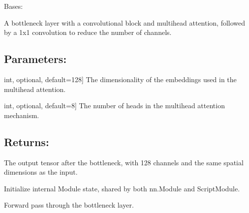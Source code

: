 \documentclass[a4paper,10pt,english]{sphinxmanual}
\begin{document}
\begin{fulllineitems}
\label{\detokenize{models:fireDiff.Models.unet.Bottleneck}}
\pysigstartsignatures
{}
\pysigstopsignatures
\sphinxAtStartPar
Bases: 

\sphinxAtStartPar
A bottleneck layer with a convolutional block and multi\sphinxhyphen{}head attention,
followed by a 1x1 convolution to reduce the number of channels.


\subsection{Parameters:}
\label{\detokenize{models:parameters}}\begin{description}
\sphinxlineitem{embed\_dim}{[}int, optional, default=128{]}
\sphinxAtStartPar
The dimensionality of the embeddings used in the multi\sphinxhyphen{}head attention.

\sphinxlineitem{num\_heads}{[}int, optional, default=8{]}
\sphinxAtStartPar
The number of heads in the multi\sphinxhyphen{}head attention mechanism.

\end{description}


\subsection{Returns:}
\label{\detokenize{models:returns}}\begin{description}
\sphinxAtStartPar
The output tensor after the bottleneck, with 128 channels and the
same spatial dimensions as the input.

\end{description}

\sphinxAtStartPar
Initialize internal Module state, shared by both nn.Module and ScriptModule.

\begin{fulllineitems}
\label{\detokenize{models:fireDiff.Models.unet.Bottleneck.forward}}
\pysigstartsignatures
{}
\pysigstopsignatures
\sphinxAtStartPar
Forward pass through the bottleneck layer.



\end{fulllineitems}
\end{fulllineitems}
\end{document}
